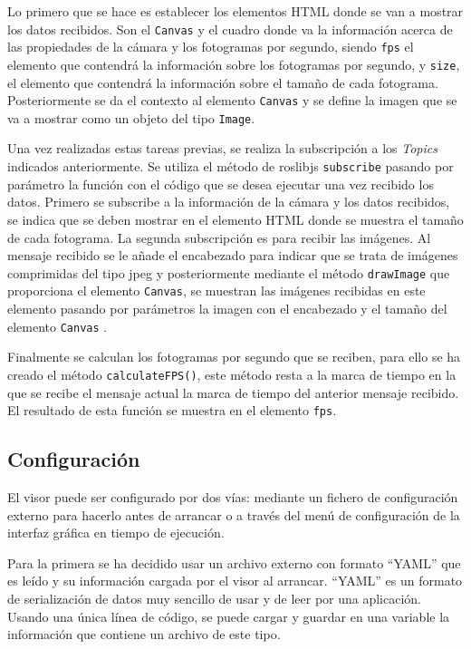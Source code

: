 Lo primero que se hace es establecer los elementos HTML donde se van a mostrar los datos recibidos. Son el \texttt{Canvas} y el cuadro donde va la información acerca de las propiedades de la cámara y los fotogramas por segundo, siendo \texttt{fps} el elemento que contendrá la información sobre los fotogramas por segundo, y \texttt{size}, el elemento que contendrá la información sobre el tamaño de cada fotograma. Posteriormente se da el contexto al elemento \texttt{Canvas}  y se define la imagen que se va a mostrar como un objeto del tipo \texttt{Image}.

Una vez realizadas estas tareas previas, se realiza la subscripción a los \textit{Topics} indicados anteriormente. Se utiliza el método de roslibjs \texttt{subscribe} pasando por parámetro la función con el código que se desea ejecutar una vez recibido los datos. Primero se subscribe a la información de la cámara y los datos recibidos, se indica que se deben mostrar en el elemento HTML donde se muestra el tamaño de cada fotograma.
La segunda subscripción es para recibir las imágenes. Al mensaje recibido se le añade el encabezado para indicar que se trata de imágenes comprimidas del tipo jpeg y posteriormente mediante el método \texttt{drawImage} que proporciona el elemento \texttt{Canvas}, se muestran las imágenes recibidas en este elemento pasando por parámetros la imagen con el encabezado y el tamaño del elemento \texttt{Canvas} .

Finalmente se calculan los fotogramas por segundo que se reciben, para ello se ha creado el método \texttt{calculateFPS()}, este método resta a la marca de tiempo en la que se recibe el mensaje actual la marca de tiempo del anterior mensaje recibido. El resultado de esta función se muestra en el elemento \texttt{fps}.

\subsection{Configuración}
El visor puede ser configurado por dos vías: mediante un fichero de configuración externo para hacerlo antes de arrancar o a través del menú de configuración de la interfaz gráfica en tiempo de ejecución.

Para la primera se ha decidido usar un archivo externo con formato ``YAML'' que es leído y su información cargada por el visor al arrancar. ``YAML'' es un formato de serialización de datos muy sencillo de usar y de leer por una aplicación. Usando una única línea de código, se puede cargar y guardar en una variable la información que contiene un archivo de este tipo. 

